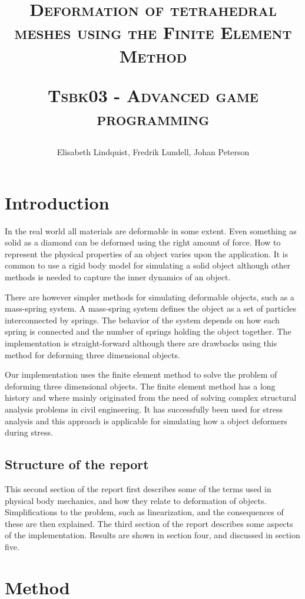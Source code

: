 \documentclass[10pt,a4paper]{article}
\author{Elisabeth Lindquist, Fredrik Lundell, Johan Peterson}
\title{\textsc{Deformation of tetrahedral meshes using the Finite Element Method}\\\begin{small}\textsc{Tsbk03 - Advanced game programming}\end{small}}
\begin{document}
\maketitle
\begin{abstract}

\end{abstract}
\pagebreak
\tableofcontents
\pagebreak

\section{Introduction}
In the real world all materials are deformable in some extent. Even something as solid as a diamond can be deformed using the right amount of force. How to represent the physical properties of an object varies upon the application. It is common to use a rigid body model for simulating a solid object although other methods is needed to capture the inner dynamics of an object.

There are however simpler methods for simulating deformable objects, such as a mass-spring system. A mass-spring system defines the object as a set of particles interconnected by springs. The behavior of the system depends on how each spring is connected and the number of springs holding the object together. The implementation is straight-forward although there are drawbacks using this method for deforming three dimensional objects.

Our implementation uses the finite element method to solve the problem of deforming three dimensional objects. The finite element method has a long history and where mainly originated from the need of solving complex structural analysis problems in civil engineering. It has successfully been used for stress analysis and this approach is applicable for simulating how a object deformers during stress.

\subsection{Structure of the report}
This second section of the report first describes some of the terms used in physical body mechanics, and how they relate to deformation of objects. Simplifications to the problem, such as linearization, and the consequences of these are then explained. The third section of the report describes some aspects of the implementation. Results are shown in section four, and discussed in section five.

\section{Method}
\end{document}
